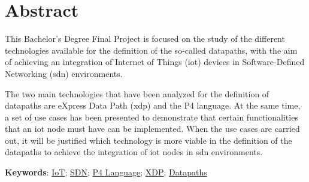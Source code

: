 \chapter{Abstract}
\thispagestyle{empty}

This Bachelor's Degree Final Project is focused on the study of the different technologies available for the definition of the so-called datapaths, with the aim of achieving an integration of Internet of Things (\gls{iot}) devices in Software-Defined Networking (\gls{sdn}) environments. \newline

The two main technologies that have been analyzed for the definition of datapaths are 
eXpress Data Path (\gls{xdp}) and the P4 language. At the same time, a set of use cases has been presented to demonstrate that certain functionalities that an \gls{iot} node must have can be implemented. When the use cases are carried out, it will be justified which technology is more viable in the definition of the datapaths to achieve the integration of \gls{iot} nodes in \gls{sdn} environments.

\vspace{1cm}

	\textbf{Keywords}: \href{https://scholar.google.es/scholar?q=Internet+of+Things}{IoT}; \href{https://www.opennetworking.org/sdn-definition}{SDN}; 
	\href{https://p4.org/}{P4 Language}; \href{https://scholar.google.es/scholar?q=XDP+linux}{XDP};
	\href{https://scholar.google.es/scholar?q=Datapaths}{Datapaths}



\cleardoublepage %




